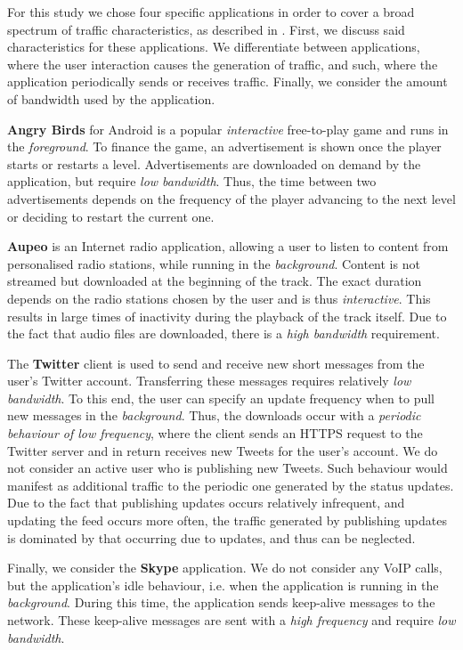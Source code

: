 For this study we chose four specific applications in order to cover a broad spectrum of traffic characteristics, as described in .
First, we discuss said characteristics for these applications.
We differentiate between applications, where the user interaction causes the generation of traffic, and such, where the application periodically sends or receives traffic.
Finally, we consider the amount of bandwidth used by the application.

\textbf{Angry Birds} for Android is a popular \emph{interactive} free-to-play game and runs in the \emph{foreground}.
To finance the game, an advertisement is shown once the player starts or restarts a level.
Advertisements are downloaded on demand by the application, but require \emph{low bandwidth}.
Thus, the time between two advertisements depends on the frequency of the player advancing to the next level or deciding to restart the current one.

\textbf{Aupeo} is an Internet radio application, allowing a user to listen to content from personalised radio stations, while running in the \emph{background}.
Content is not streamed but downloaded at the beginning of the track.
The exact duration depends on the radio stations chosen by the user and is thus \emph{interactive}.
This results in large times of inactivity during the playback of the track itself.
Due to the fact that audio files are downloaded, there is a \emph{high bandwidth} requirement.

The \textbf{Twitter} client is used to send and receive new short messages from the user's Twitter account.
Transferring these messages requires relatively \emph{low bandwidth}.
To this end, the user can specify an update frequency when to pull new messages in the \emph{background}.
Thus, the downloads occur with a \emph{periodic behaviour of low frequency}, where
the client sends an \gls{HTTPS} request to the Twitter server and in return receives new Tweets for the user's account.
We do not consider an active user who is publishing new Tweets.
Such behaviour would manifest as additional traffic to the periodic one generated by the status updates.
Due to the fact that publishing updates occurs relatively infrequent, and updating the feed occurs more often, the traffic generated by publishing updates is dominated by that occurring due to updates, and thus can be neglected.

Finally, we consider the \textbf{Skype} application.
We do not consider any \gls{VoIP} calls, but the application's idle behaviour, i.e. when the application is running in the \emph{background}.
During this time, the application sends keep-alive messages to the network.
These keep-alive messages are sent with a \emph{high frequency} and require \emph{low bandwidth}.

